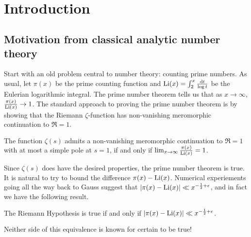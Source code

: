
\chapter{Introduction}





\section{Motivation from classical analytic number theory}

Start with an old problem central to number theory: counting 
prime numbers. As usual, let $\pi(x)$ be the prime counting function and 
$\operatorname{Li}(x) = \int_2^x \frac{\mathrm{d} t}{\log t}$ be the Eulerian logarithmic integral. 
The prime number theorem tells us that as $x\to \infty$, 
$\frac{\pi(x)}{\operatorname{Li}(x)} \to 1$. The standard approach 
to proving the prime number theorem is by showing that the Riemann 
$\zeta$-function has non-vanishing meromorphic continuation to $\Re = 1$.

\begin{theorem}
The function $\zeta(s)$ admits a non-vanishing meromorphic continuation to 
$\Re = 1$ with at most a simple pole at $s=1$, if and only if 
$\lim_{x\to \infty} \frac{\pi(x)}{\operatorname{Li}(x)} = 1$. 
\end{theorem}

Since $\zeta(s)$ does have the desired properties, the prime number 
theorem is true. It is natural to try to bound the difference 
$\pi(x) - \operatorname{Li}(x)$. Numerical experiements going all the way back to Gauss 
suggest that $|\pi(x) - \operatorname{Li}(x)| \ll x^{-\frac 1 2+\epsilon}$, and in fact we 
have the following result. 

\begin{theorem}
The Riemann Hypothesis is true if and only if 
$|\pi(x) - \operatorname{Li}(x)| \ll x^{-\frac 1 2+\epsilon}$. 
\end{theorem}

Neither side of this equivalence is known for certain to be true! 

